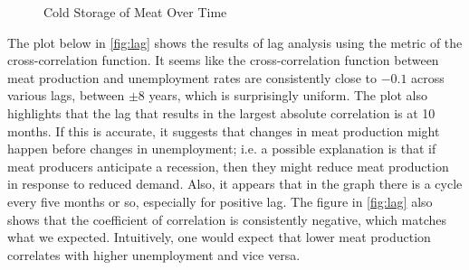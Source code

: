 \documentclass[12pt]{article}
\begin{document}
\begin{figure}[H]
    \centering
    \caption{Cold Storage of Meat Over Time}
    \label{fig:meat_storage}
\end{figure}

The plot below in \ref{fig:lag} shows the results of lag analysis using the metric of the cross-correlation function. It seems like the cross-correlation function between meat production and unemployment rates are consistently close to $-0.1$ across various lags, between $\pm 8$ years, which is surprisingly uniform. The plot also highlights that the lag that results in the largest absolute correlation is at 10 months. If this is accurate, it suggests that changes in meat production might happen before changes in unemployment; i.e. a possible explanation is that if meat producers anticipate a recession, then they might reduce meat production in response to reduced demand. Also, it appears that in the graph there is a cycle every five months or so, especially for positive lag. The figure in \ref{fig:lag} also shows that the coefficient of correlation is consistently negative, which matches what we expected. Intuitively, one would expect that lower meat production correlates with higher unemployment and vice versa.
\end{document}
